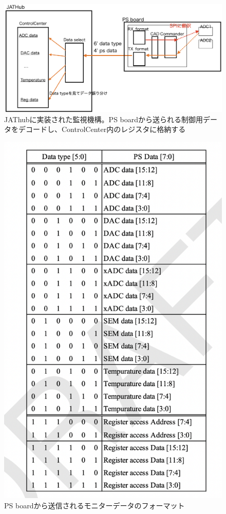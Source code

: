 \begin{figure} 
\centering
\includegraphics[width=16cm]{fig/JATHubmonitor.png}
\caption[JATHub monitor]{JAThubに実装された監視機構。PS boardから送られる制御用データをデコードし、ControlCenter内のレジスタに格納する}
\label{JATHubmonitor}
\end{figure}

\begin{figure} 
\centering
\includegraphics[width=16cm]{fig/PSBdataformat.png}
\caption[PS boardから送信されるモニターデータのフォーマット]{PS boardから送信されるモニターデータのフォーマット}
\label{PSBdataformat}
\end{figure}

